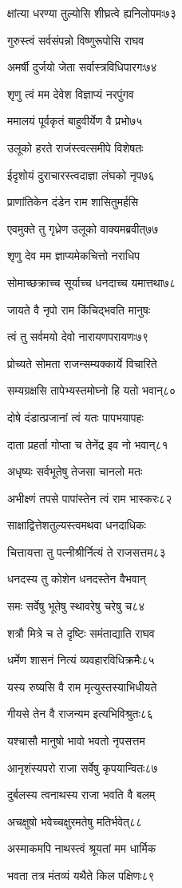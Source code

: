 क्षांत्या धरण्या तुल्योसि शीघ्रत्वे ह्यनिलोपमः७३

गुरुस्त्वं सर्वसंपन्नो विष्णुरूपोसि राघव

अमर्षी दुर्जयो जेता सर्वास्त्रविधिपारगः७४

शृणु त्वं मम देवेश विज्ञाप्यं नरपुंगव

ममालयं पूर्वकृतं बाहुवीर्येण वै प्रभो७५

उलूको हरते राजंस्त्वत्समीपे विशेषतः

ईदृशोयं दुराचारस्त्वदाज्ञा लंघको नृप७६

प्राणांतिकेन दंडेन राम शासितुमर्हसि

एवमुक्ते तु गृध्रेण उलूको वाक्यमब्रवीत्७७

शृणु देव मम ज्ञाप्यमेकचित्तो नराधिप

सोमाच्छक्राच्च सूर्याच्च धनदाच्च यमात्तथा७८

जायते वै नृपो राम किंचिद्भवति मानुषः

त्वं तु सर्वमयो देवो नारायणपरायणः७९

प्रोच्यते सोमता राजन्सम्यक्कार्ये विचारिते

सम्यग्रक्षसि तापेभ्यस्तमोघ्नो हि यतो भवान्८०

दोषे दंडात्प्रजानां त्वं यतः पापभयापहः

दाता प्रहर्ता गोप्ता च तेनेंद्र इव नो भवान्८१

अधृष्यः सर्वभूतेषु तेजसा चानलो मतः

अभीक्ष्णं तपसे पापांस्तेन त्वं राम भास्करः८२

साक्षाद्वित्तेशतुल्यस्त्वमथवा धनदाधिकः

चित्तायत्ता तु पत्नीश्रीर्नित्यं ते राजसत्तम८३

धनदस्य तु कोशेन धनदस्तेन वैभवान्

समः सर्वेषु भूतेषु स्थावरेषु चरेषु च८४

शत्रौ मित्रे च ते दृष्टिः समंताद्याति राघव

धर्मेण शासनं नित्यं व्यवहारविधिक्रमैः८५

यस्य रुष्यसि वै राम मृत्युस्तस्याभिधीयते

गीयसे तेन वै राजन्यम इत्यभिविश्रुतः८६

यश्चासौ मानुषो भावो भवतो नृपसत्तम

आनृशंस्यपरो राजा सर्वेषु कृपयान्वितः८७

दुर्बलस्य त्वनाथस्य राजा भवति वै बलम्

अचक्षुषो भवेच्चक्षुरमतेषु मतिर्भवेत्८८

अस्माकमपि नाथस्त्वं श्रूयतां मम धार्मिक

भवता तत्र मंतव्यं यथैते किल पक्षिणः८९

